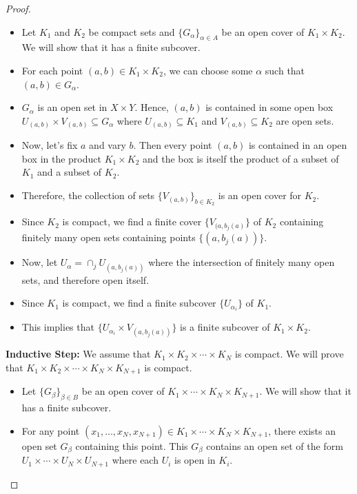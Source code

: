 \documentclass[10pt]{article}
\newenvironment{problem}[2][Problem]{\begin{trivlist}
\item[\hskip \labelsep {\bfseries #1}\hskip \labelsep {\bfseries #2.}]}{\end{trivlist}}
\begin{document}
\begin{problem}{3}
\begin{enumerate}
\begin{proof}
                \begin{itemize}
                    \item Let $K_1$ and $K_2$ be compact sets and $\{G_\alpha\}_{\alpha \in A}$ be an open cover of $K_1 \times K_2$. We will show that it has a finite subcover.
                    \item For each point $(a, b) \in K_1 \times K_2$, we can choose some $\alpha$ such that $(a, b) \in G_\alpha$.
                    \item $G_{\alpha}$ is an open set in $X \times Y$.
                    Hence, $(a,b)$ is contained in some open box $U_{(a,b)} \times V_{(a,b)} \subseteq G_\alpha$ where
                    $U_{(a,b)} \subseteq K_1$ and $V_{(a,b)} \subseteq K_2$ are open sets.
                    \item Now, let's fix $a$ and vary $b$. Then every point $(a,b)$ is contained in an open box in the product $K_1 \times K_2$ and the box is itself the product of a subset of $K_1$ and a subset of $K_2$.
                    \item Therefore, the collection of sets $\{V_{(a,b)}\}_{b \in K_2}$ is an open cover for $K_2$.
                    \item Since $K_2$ is compact, we find a finite cover $\{V_{(a,b_j(a)}\}$ of $K_2$ containing finitely many open sets containing points $\{(a, b_j(a))\}$.
                    \item Now, let $U_\alpha = \cap_j U_{(a, b_j(a))}$ where the intersection of finitely many open sets, and therefore open itself.
                    \item Since $K_1$ is compact, we find a finite subcover $\{U_{\alpha_i}\}$ of $K_1$.
                    \item This implies that $\{U_{\alpha_i} \times V_{(a, b_j(a))}\}$ is a finite subcover of $K_1 \times K_2$.
                \end{itemize}

                \textbf{Inductive Step:} We assume that $K_1 \times K_2 \times \cdots \times K_N$ is compact. We will prove that $K_1 \times K_2 \times \cdots \times K_N \times K_{N+1}$ is compact.

                \begin{itemize}
                    \item Let $\{G_\beta\}_{\beta \in B}$ be an open cover of $K_1 \times \cdots \times K_N \times K_{N+1}$. We will show that it has a finite subcover.
    
                    \item For any point $(x_1, \ldots, x_N, x_{N+1}) \in K_1 \times \cdots \times K_N \times K_{N+1}$, there exists an open set $G_\beta$ containing this point. This $G_\beta$ contains an open set of the form $U_1 \times \cdots \times U_N \times U_{N+1}$ where each $U_i$ is open in $K_i$.
                    

\end{itemize}
\end{proof}
\end{enumerate}
\end{problem}
\end{document}
